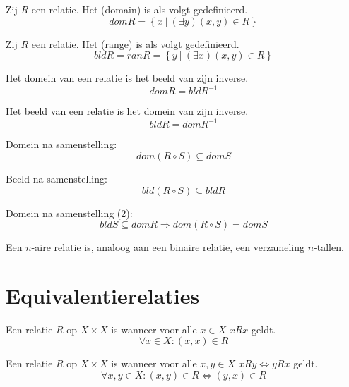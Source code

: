 \documentclass[main.tex]{subfiles}
\begin{document}
\begin{de}
  Zij $R$ een relatie. Het  (domain) is als volgt gedefinieerd.
  \[ dom R = \left\{ x \ |\ (\exists y)(x,y) \in R \right\} \]
\end{de}

\begin{de}
  Zij $R$ een relatie. Het  (range) is als volgt gedefinieerd.
  \[ bld  R = ran R = \left\{ y \ |\ (\exists x)(x,y) \in R \right\} \]
\end{de}

\begin{st}
  Het domein van een relatie is het beeld van zijn inverse.
  \[ dom R = bld R^{-1} \]
\end{st}

\begin{st}
  Het beeld van een relatie is het domein van zijn inverse.
  \[ bld R = dom R^{-1} \]
\end{st}

\begin{st}
  Domein na samenstelling:
  \[ dom (R \circ S) \subseteq dom S \]
\end{st}
 
\begin{st}
  Beeld na samenstelling:
  \[ bld (R \circ S) \subseteq bld R \]
\end{st}

\begin{st}
  Domein na samenstelling (2):
  \[ bld S \subseteq dom R \Rightarrow dom(R \circ S) = dom S \]
\end{st}

\begin{de}
  Een $n$-aire relatie is, analoog aan een binaire relatie, een verzameling $n$-tallen.
\end{de}

\section{Equivalentierelaties}
\label{sec:equivalentierelaties}

\begin{de}
  \label{de:reflexief}
  Een relatie $R$ op $X \times X$ is  wanneer voor alle $x\in X$ $xRx$ geldt.
  \[ \forall x \in X: (x,x) \in R \]
\end{de}

\begin{de}
  \label{de:symmetrisch}
  Een relatie $R$ op $X \times X$ is  wanneer voor alle $x,y\in X$ $xRy \Leftrightarrow yRx$ geldt.
  \[ \forall x,y \in X: (x,y) \in R \Leftrightarrow (y,x) \in R\]
\end{de}
\end{document}
